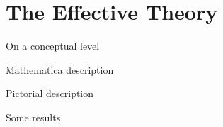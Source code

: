 \section{The Effective Theory}

\begin{frame}{On a conceptual level}
  
\end{frame}

\begin{frame}{Mathematica description}
  
\end{frame}

\begin{frame}{Pictorial description}
  
\end{frame}

\begin{frame}{Some results}
  
\end{frame}

